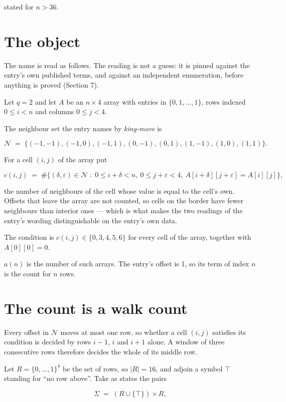 \documentclass[11pt]{article}
\theoremstyle{definition}
\begin{document}
stated for $n > 36$.

\section{The object}

The name is read as follows. The reading is not a guess: it is pinned against the entry's own published terms, and against an independent enumeration, before anything is proved (Section 7).

Let $q = 2$ and let $A$ be an $n \times 4$ array with entries in $\{0,1,\dots,1\}$, rows indexed $0 \le i < n$ and columns $0 \le j < 4$.

The neighbour set the entry names by {\itshape king-move} is

\[\mathcal{N} \;=\; \{(-1,-1), (-1,0), (-1,1), (0,-1), (0,1), (1,-1), (1,0), (1,1)\}.\]

For a cell $(i,j)$ of the array put

\[c(i,j) \;=\; \#\bigl\{(\delta,\varepsilon)\in\mathcal{N} \;:\; 0\le i+\delta<n,\ 0\le j+\varepsilon<4,\ A[i+\delta][j+\varepsilon] = A[i][j]\bigr\},\]

the number of neighbours of the cell whose value is equal to the cell's own. Offsets that leave the array are not counted, so cells on the border have fewer neighbours than interior ones --- which is what makes the two readings of the entry's wording distinguishable on the entry's own data.

The condition is $c(i,j) \in \{0, 3, 4, 5, 6\}$ for every cell of the array, together with $A[0][0]=0$.

$a(n)$ is the number of such arrays. The entry's offset is 1, so its term of index $n$ is the count for $n$ rows.

\section{The count is a walk count}

Every offset in $\mathcal{N}$ moves at most one row, so whether a cell $(i,j)$ satisfies its condition is decided by rows $i-1$, $i$ and $i+1$ alone. A window of three consecutive rows therefore decides the whole of its middle row.

Let $R = \{0,\dots,1\}^{4}$ be the set of rows, so $|R| = 16$, and adjoin a symbol $\top$ standing for ``no row above''. Take as states the pairs

\[\Sigma \;=\; (R \cup \{\top\}) \times R,\]
\end{document}
